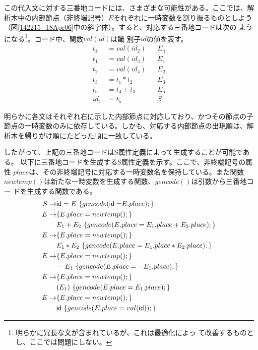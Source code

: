 この代入文に対する三番地コードには、さまざまな可能性がある。ここでは、解
析木中の内部節点（非終端記号）$E$それぞれに一時変数を割り振るものとしよう
（図\ref{142215_18Apr06}中の斜字体）。すると、対応する三番地コードは次の
ようになる\footnote{明らかに冗長な文が含まれているが、これは最適化によっ
て改善するものとし、ここでは問題にしない。}。コード中、関数$val(id)$は識
別子$id$の値を表す。
\begin{align*}
 t_4 & = val(id_2) && E_4 \\
 t_1 & = val(id_3) && E_1 \\
 t_2 & = val(id_4) && E_2 \\
 t_3 & = t_1 \ast t_2 && E_3 \\
 t_5 & = t_4 + t_3 && E_5 \\
 id_1 & = t_5 && S
\end{align*}

明らかに各文はそれぞれ右に示した内部節点に対応しており、かつその節点の子
節点の一時変数のみに依存している。しかも、対応する内部節点の出現順は、解
析木を帰りがけ順にたどった順に一致している。

したがって、上記の三番地コードはS属性定義によって生成することが可能である。
以下に三番地コードを生成するS属性定義を示す。ここで、非終端記号の属性
$place$は、その非終端記号に対応する一時変数名を保持している。また関数
$newtemp()$は新たな一時変数を生成する関数、$gencode()$は引数から三番地コー
ドを生成する関数である。
\begin{align*}
 S \rightarrow & {\sf id} = E\ \{ gencode({\sf id = } E.place);\} \\
 E \rightarrow & \{E.place = newtemp(); \} \\
   & E_1 + E_2\ \{ gencode(E.place = E_1.place + E_2.place); \}\\
 E \rightarrow & \{E.place = newtemp(); \} \\
   & E_1 \ast E_2\ \{ gencode(E.place = E_1.place * E_2.place); \} \\
 E \rightarrow & \{E.place = newtemp(); \} \\
   & - E_1\ \{ gencode(E.place = - E_1.place); \}\\
 E \rightarrow & \{E.place = newtemp(); \} \\
   & ( E_1 )\ \{ gencode(E.place = E_1.place); \} \\
 E \rightarrow & \{E.place = newtemp(); \} \\
   & {\sf id}\ \{ gencode(E.place = val({\sf id})); \}
\end{align*}

